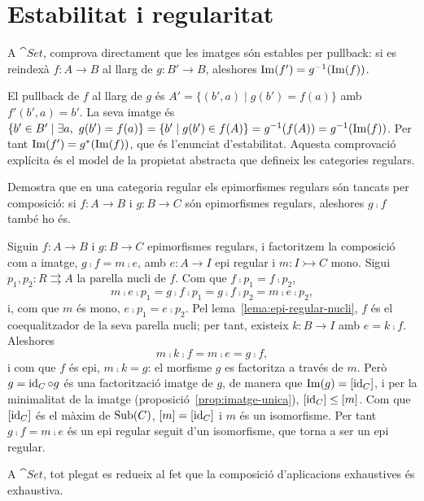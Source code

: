 \section{Estabilitat i regularitat}

\begin{exercici}
A $\cat{Set}$, comprova directament que les imatges són estables per pullback: si es reindexà $f\colon A\to B$ al llarg de $g\colon B'\to B$, aleshores $\operatorname{Im}(f')=g^{-1}(\operatorname{Im}(f))$.
\end{exercici}

\begin{solucio}
El pullback de $f$ al llarg de $g$ és $A'=\{(b',a)\mid g(b')=f(a)\}$ amb $f'(b',a)=b'$. La seva imatge és $\{b'\in B'\mid\exists a,\ g(b')=f(a)\}=\{b'\mid g(b')\in f(A)\}=g^{-1}(f(A))=g^{-1}(\Imatge(f))$. Per tant $\operatorname{Im}(f')=g^{*}(\operatorname{Im}(f))$, que és l'enunciat d'estabilitat. Aquesta comprovació explícita és el model de la propietat abstracta que defineix les categories regulars.
\end{solucio}

\begin{exercici}
Demostra que en una categoria regular els epimorfismes regulars són tancats per composició: si $f\colon A\to B$ i $g\colon B\to C$ són epimorfismes regulars, aleshores $g\comp f$ també ho és.
\end{exercici}

\begin{solucio}
Siguin $f\colon A\to B$ i $g\colon B\to C$ epimorfismes regulars, i factoritzem la composició com a imatge, $g\comp f=m\comp e$, amb $e\colon A\to I$ epi regular i $m\colon I\rightarrowtail C$ mono. Sigui $p_1,p_2\colon R\rightrightarrows A$ la parella nucli de $f$. Com que $f\comp p_1=f\comp p_2$,
\[
m\comp e\comp p_1=g\comp f\comp p_1=g\comp f\comp p_2=m\comp e\comp p_2,
\]
i, com que $m$ és mono, $e\comp p_1=e\comp p_2$. Pel lema~\ref{lema:epi-regular-nucli}, $f$ és el coequalitzador de la seva parella nucli; per tant, existeix $k\colon B\to I$ amb $e=k\comp f$. Aleshores
\[
m\comp k\comp f=m\comp e=g\comp f,
\]
i com que $f$ és epi, $m\comp k=g$: el morfisme $g$ es factoritza a través de $m$. Però $g=\operatorname{id}_C\circ g$ és una factorització imatge de $g$, de manera que $\operatorname{Im}(g)=[\operatorname{id}_C]$, i per la minimalitat de la imatge (proposició~\ref{prop:imatge-unica}), $[\operatorname{id}_C]\leq[m]$. Com que $[\operatorname{id}_C]$ és el màxim de $\operatorname{Sub}(C)$, $[m]=[\operatorname{id}_C]$ i $m$ és un isomorfisme. Per tant $g\comp f=m\comp e$ és un epi regular seguit d'un isomorfisme, que torna a ser un epi regular.

A $\cat{Set}$, tot plegat es redueix al fet que la composició d'aplicacions exhaustives és exhaustiva.
\end{solucio}

